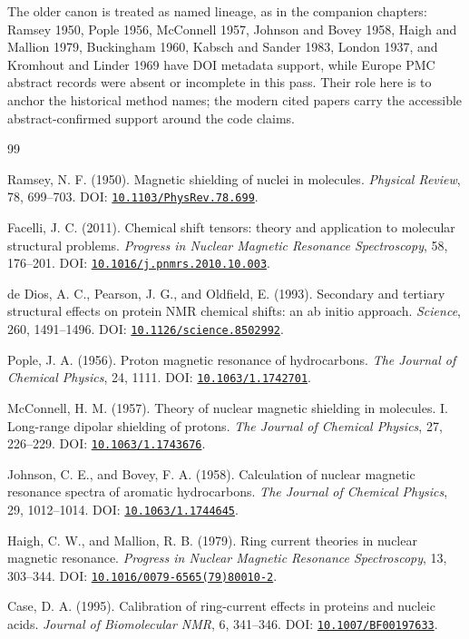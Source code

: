 \documentclass[11pt]{article}
\newcommand{\doi}[1]{\href{https://doi.org/#1}{\nolinkurl{#1}}}
\begin{document}
The older canon is treated as named lineage, as in the companion chapters:
Ramsey 1950, Pople 1956, McConnell 1957, Johnson and Bovey 1958, Haigh and
Mallion 1979, Buckingham 1960, Kabsch and Sander 1983, London 1937, and
Kromhout and Linder 1969 have DOI metadata support, while Europe PMC abstract
records were absent or incomplete in this pass. Their role here is to anchor
the historical method names; the modern cited papers carry the accessible
abstract-confirmed support around the code claims.

\begin{thebibliography}{99}

Ramsey, N. F. (1950).
Magnetic shielding of nuclei in molecules.
\emph{Physical Review}, 78, 699--703.
DOI: \doi{10.1103/PhysRev.78.699}.

Facelli, J. C. (2011).
Chemical shift tensors: theory and application to molecular structural
problems.
\emph{Progress in Nuclear Magnetic Resonance Spectroscopy}, 58, 176--201.
DOI: \doi{10.1016/j.pnmrs.2010.10.003}.

de Dios, A. C., Pearson, J. G., and Oldfield, E. (1993).
Secondary and tertiary structural effects on protein NMR chemical shifts:
an ab initio approach.
\emph{Science}, 260, 1491--1496.
DOI: \doi{10.1126/science.8502992}.

Pople, J. A. (1956).
Proton magnetic resonance of hydrocarbons.
\emph{The Journal of Chemical Physics}, 24, 1111.
DOI: \doi{10.1063/1.1742701}.

McConnell, H. M. (1957).
Theory of nuclear magnetic shielding in molecules. I. Long-range dipolar
shielding of protons.
\emph{The Journal of Chemical Physics}, 27, 226--229.
DOI: \doi{10.1063/1.1743676}.

Johnson, C. E., and Bovey, F. A. (1958).
Calculation of nuclear magnetic resonance spectra of aromatic hydrocarbons.
\emph{The Journal of Chemical Physics}, 29, 1012--1014.
DOI: \doi{10.1063/1.1744645}.

Haigh, C. W., and Mallion, R. B. (1979).
Ring current theories in nuclear magnetic resonance.
\emph{Progress in Nuclear Magnetic Resonance Spectroscopy}, 13, 303--344.
DOI: \doi{10.1016/0079-6565(79)80010-2}.

Case, D. A. (1995).
Calibration of ring-current effects in proteins and nucleic acids.
\emph{Journal of Biomolecular NMR}, 6, 341--346.
DOI: \doi{10.1007/BF00197633}.


\end{thebibliography}
\end{document}
